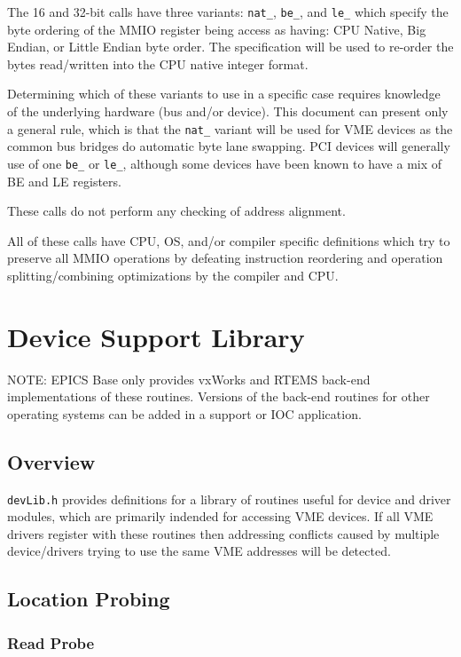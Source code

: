 The 16 and 32-bit calls have three variants: \verb|nat_|, \verb|be_|, and \verb|le_|
which specify the byte ordering of the MMIO register being access as having:
CPU Native, Big Endian, or Little Endian byte order.
The specification will be used to re-order the bytes read/written
into the CPU native integer format.

Determining which of these variants to use in a specific case
requires knowledge of the underlying hardware (bus and/or device).
This document can present only a general rule,
which is that the \verb|nat_| variant will be used
for VME devices as the common bus bridges do automatic byte lane swapping.
PCI devices will generally use of one \verb|be_| or \verb|le_|, although
some devices have been known to have a mix of BE and LE registers.

These calls do not perform any checking of address alignment.

All of these calls have CPU, OS, and/or compiler specific definitions which
try to preserve all MMIO operations by defeating instruction reordering
and operation splitting/combining optimizations by the compiler and CPU.

\section{ Device Support Library}

NOTE: EPICS Base only provides vxWorks and RTEMS back-end implementations of these routines. Versions of the 
back-end routines for other operating systems can be added in a support or IOC application.

\subsection{Overview}

\verb|devLib.h| provides definitions for a library of routines useful for device and driver modules, which are primarily 
indended for accessing VME devices. If all VME drivers register with these routines  then  addressing conflicts caused by 
multiple device/drivers trying to use the same VME addresses will be detected.

\subsection{Location Probing}

\subsubsection{Read Probe}

